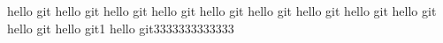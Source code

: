 hello git
hello git
hello git
hello git
hello git
hello git
hello git
hello git
hello git
hello git
hello git1
hello git3333333333333
